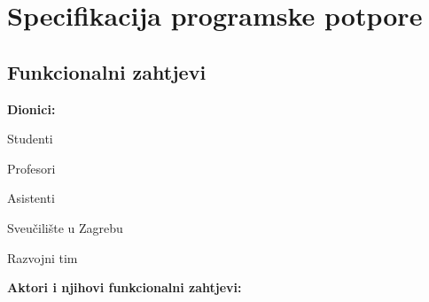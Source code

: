\chapter{Specifikacija programske potpore}

\section{Funkcionalni zahtjevi}

\noindent \textbf{Dionici:}

\begin{packed_enum}

\item Studenti
\item Profesori
\item Asistenti
\item Sveučilište u Zagrebu
\item Razvojni tim

\end{packed_enum}

\noindent \textbf{Aktori i njihovi funkcionalni zahtjevi:}


